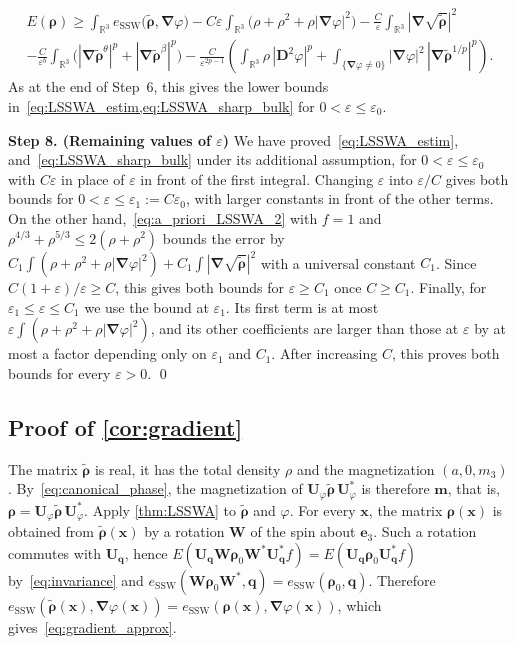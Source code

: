 \documentclass[final,reqno]{amsart}
\theoremstyle{remark}
\renewcommand{\le}{\leqslant}
\renewcommand{\ge}{\geqslant}
\renewcommand{\epsilon}{\varepsilon}
\newcommand{\wt}[1]{\widetilde{#1}}
\newcommand{\RR}{\mathbb{R}}
\newcommand{\SSW}{\mathrm{SSW}}
\newcommand{\grad}{\bm{\nabla}}
\begin{document}
\begin{multline*}
E(\bm{\rho})\ge\int_{\RR^3}e_\SSW\big(\wt{\bm{\rho}},\grad\varphi\big)-C\epsilon\int_{\RR^3}\big(\rho+\rho^2+\rho|\grad\varphi|^2\big)-\frac{C}{\epsilon}\int_{\RR^3}|\grad\sqrt{\wt{\bm{\rho}}}|^2\\
-\frac{C}{\epsilon^b}\int_{\RR^3}\Big(|\grad\wt{\bm{\rho}}^\theta|^p+|\grad\wt{\bm{\rho}}^\beta|^p\Big)
-\frac{C}{\epsilon^{2p-1}}\left(\int_{\RR^3}\rho\,|\mathbf{D}^2\varphi|^p+\int_{\{\grad\varphi\ne0\}}|\grad\varphi|^2\,|\grad\wt{\bm{\rho}}^{1/p}|^p\right).
\end{multline*}
As at the end of Step~6, this gives the lower bounds in~\cref{eq:LSSWA_estim,eq:LSSWA_sharp_bulk} for $0<\epsilon\le\epsilon_0$.

\medskip

\noindent\textbf{Step 8. (Remaining values of $\epsilon$)} We have proved~\cref{eq:LSSWA_estim}, and~\cref{eq:LSSWA_sharp_bulk} under its additional assumption, for $0<\epsilon\le\epsilon_0$ with $C\epsilon$ in place of $\epsilon$ in front of the first integral. Changing $\epsilon$ into $\epsilon/C$ gives both bounds for $0<\epsilon\le\epsilon_1:=C\epsilon_0$, with larger constants in front of the other terms. On the other hand,~\cref{eq:a_priori_LSSWA_2} with $f=1$ and $\rho^{4/3}+\rho^{5/3}\le2(\rho+\rho^2)$ bounds the error by $C_1\int(\rho+\rho^2+\rho|\grad\varphi|^2)+C_1\int|\grad\sqrt{\wt{\bm{\rho}}}|^2$ with a universal constant $C_1$. Since $C(1+\epsilon)/\epsilon\ge C$, this gives both bounds for $\epsilon\ge C_1$ once $C\ge C_1$. Finally, for $\epsilon_1\le\epsilon\le C_1$ we use the bound at $\epsilon_1$. Its first term is at most $\epsilon\int(\rho+\rho^2+\rho|\grad\varphi|^2)$, and its other coefficients are larger than those at $\epsilon$ by at most a factor depending only on $\epsilon_1$ and $C_1$. After increasing $C$, this proves both bounds for every $\epsilon>0$.
\qed

\subsection{Proof of \texorpdfstring{\cref{cor:gradient}}{the azimuthal gradient form}}\label{sec:proof_gradient}
The matrix $\wt{\bm{\rho}}$ is real, it has the total density $\rho$ and the magnetization $(a,0,m_3)$. By~\cref{eq:canonical_phase}, the magnetization of $\mathbf{U}_\varphi\wt{\bm{\rho}}\,\mathbf{U}_\varphi^*$ is therefore $\mathbf{m}$, that is, $\bm{\rho}=\mathbf{U}_\varphi\wt{\bm{\rho}}\,\mathbf{U}_\varphi^*$. Apply \cref{thm:LSSWA} to $\wt{\bm{\rho}}$ and $\varphi$. For every $\mathbf{x}$, the matrix $\bm{\rho}(\mathbf{x})$ is obtained from $\wt{\bm{\rho}}(\mathbf{x})$ by a rotation $\mathbf{W}$ of the spin about $\mathbf{e}_3$. Such a rotation commutes with $\mathbf{U}_{\mathbf{q}}$, hence $E(\mathbf{U}_{\mathbf{q}}\mathbf{W}\bm{\rho}_0\mathbf{W}^*\mathbf{U}_{\mathbf{q}}^*f)=E(\mathbf{U}_{\mathbf{q}}\bm{\rho}_0\mathbf{U}_{\mathbf{q}}^*f)$ by~\cref{eq:invariance} and $e_\SSW(\mathbf{W}\bm{\rho}_0\mathbf{W}^*,\mathbf{q})=e_\SSW(\bm{\rho}_0,\mathbf{q})$. Therefore $e_\SSW(\wt{\bm{\rho}}(\mathbf{x}),\grad\varphi(\mathbf{x}))=e_\SSW(\bm{\rho}(\mathbf{x}),\grad\varphi(\mathbf{x}))$, which gives~\cref{eq:gradient_approx}.
\end{document}
